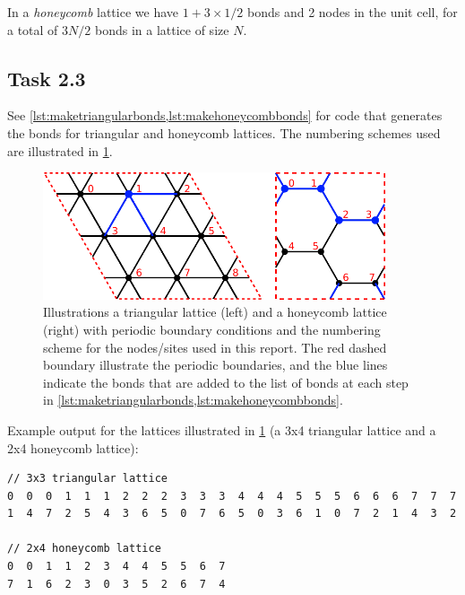 \documentclass[a4paper]{article}
\begin{document}
In a \emph{honeycomb} lattice we have $1 + 3\times 1/2$ bonds and 2 nodes in the unit cell, for a total of $3N/2$ bonds in a lattice of size $N$.

\subsection*{Task 2.3}
See \cref{lst:maketriangularbonds,lst:makehoneycombbonds} for code that generates the bonds for triangular and honeycomb lattices. The numbering schemes used are illustrated in \cref{fig:otherlattices}.

\begin{figure}[htb!]
    \centering
    \includegraphics[width=0.9\textwidth]{both_lattices.pdf}%
    \caption{Illustrations a triangular lattice (left) and a honeycomb lattice (right) with periodic boundary conditions and the numbering scheme for the nodes/sites used in this report. The red dashed boundary illustrate the periodic boundaries, and the blue lines indicate the bonds that are added to the list of bonds at each step in \cref{lst:maketriangularbonds,lst:makehoneycombbonds}. \label{fig:otherlattices}}
\end{figure}

\begin{listing}[h!]
%
\caption{%
    Program that generates bonds for a triangular lattice with periodic boundary conditions. %
    \label{lst:maketriangularbonds}%
}
\end{listing}

\begin{listing}[h!]
%
\caption{%
    Program that generates bonds for a honeycomb lattice with periodic boundary conditions. %
    \label{lst:makehoneycombbonds}%
}
\end{listing}

Example output for the lattices illustrated in \cref{fig:otherlattices} (a 3x4 triangular lattice and a 2x4 honeycomb lattice):
\begin{verbatim}
// 3x3 triangular lattice
0  0  0  1  1  1  2  2  2  3  3  3  4  4  4  5  5  5  6  6  6  7  7  7
1  4  7  2  5  4  3  6  5  0  7  6  5  0  3  6  1  0  7  2  1  4  3  2

// 2x4 honeycomb lattice
0  0  1  1  2  3  4  4  5  5  6  7
7  1  6  2  3  0  3  5  2  6  7  4
\end{verbatim}
\end{document}
